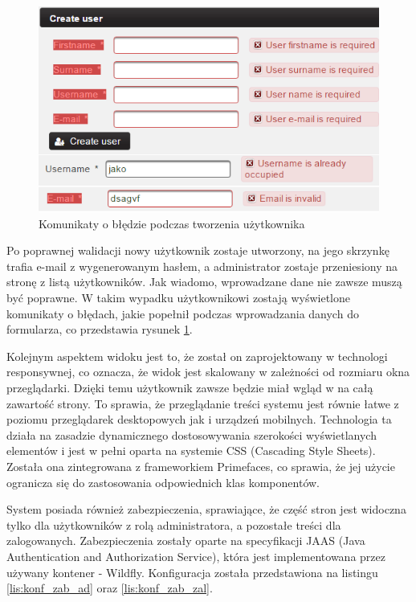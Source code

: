 \begin{figure}[t]
	\centering
	\includegraphics[width=15cm]{rysunki/user-blad.png}	
	\caption{Komunikaty o błędzie podczas tworzenia użytkownika}
	\label{fig:user-blad}
\end{figure}

Po poprawnej walidacji nowy użytkownik zostaje utworzony, na jego skrzynkę trafia e-mail z wygenerowanym hasłem, a administrator zostaje przeniesiony na stronę z listą użytkowników. Jak wiadomo, wprowadzane dane nie zawsze muszą być poprawne. W takim wypadku użytkownikowi zostają wyświetlone komunikaty o błędach, jakie popełnił podczas wprowadzania danych do formularza, co przedstawia rysunek \ref{fig:user-blad}.

Kolejnym aspektem widoku jest to, że został on zaprojektowany w technologi responsywnej, co oznacza, że widok jest skalowany w zależności od rozmiaru okna przeglądarki. Dzięki temu użytkownik zawsze będzie miał wgląd w na całą zawartość strony. To sprawia, że przeglądanie treści systemu jest równie łatwe z poziomu przeglądarek desktopowych jak i urządzeń mobilnych. Technologia ta działa na zasadzie dynamicznego dostosowywania szerokości wyświetlanych elementów i jest w pełni oparta na systemie CSS (Cascading Style Sheets). Została ona zintegrowana z frameworkiem Primefaces, co sprawia, że jej użycie ogranicza się do zastosowania odpowiednich klas komponentów.

System posiada również zabezpieczenia, sprawiające, że część stron jest widoczna tylko dla użytkowników z rolą administratora, a pozostałe treści dla zalogowanych. Zabezpieczenia zostały oparte na specyfikacji JAAS (Java Authentication and Authorization Service), która jest implementowana przez używany kontener - Wildfly. Konfiguracja została przedstawiona na listingu \ref{lis:konf_zab_ad} oraz \ref{lis:konf_zab_zal}.

